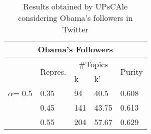 \begin{table}[t]
\center
\begin{scriptsize}
\caption{Results obtained by UPsCAle considering Obama's followers in Twitter}\label{tbl:unlabeled}
\begin{tabular}{|l|l|l|l|l|}
\hline
 \multicolumn{5}{|c|}{Obama's Followers}  \\  \hline 
 \multirow{5}{*}{$\alpha$= 0.5} &\multirow{2}{*}{Repres.} & \multicolumn{2}{c|}{\#Topics} & \multirow{2}{*}{Purity}  \\ \cline{3-4}
 & & k & k' & \\ \cline{2-5}
 &0.35 & 94& 40.5 & 0.608 \\ %
 &0.45 & 141 & 43.75 & 0.613 \\ %
 &0.55 & 204 & 57.67 & 0.629 \\ \hline
\end{tabular}
\end{scriptsize}
\end{table}

% 
